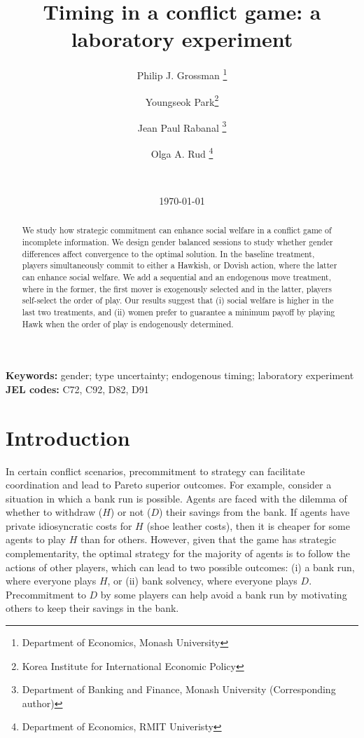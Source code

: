\documentclass[12pt, letterpaper]{article}
\theoremstyle{plain}
\begin{document}
\newtheorem{Assumption}{Assumption}
\newtheorem{Proposition}{Proposition}
\newtheorem{Corollary}{Corollary}
\newtheorem{Hypothesis}{Hypothesis}
\newtheorem{Result}{Result}


\title{Timing in a conflict game: a laboratory experiment}

\author{Philip J. Grossman
\footnote{Department of Economics, Monash University} \and Youngseok Park\thanks{Korea Institute for International Economic Policy} \and Jean Paul Rabanal
\thanks{Department of Banking and Finance, Monash University (Corresponding author)}
 \and Olga A. Rud \footnote{Department of Economics, RMIT Univeristy} \and  \ }
\date{\today}
\maketitle


\begin{abstract}
We study how strategic commitment can enhance social welfare in a conflict game of incomplete information. We design gender balanced sessions to study whether gender differences affect convergence to the optimal solution. In the baseline treatment, players simultaneously commit to either a Hawkish, or Dovish action, where the latter can enhance social welfare. We add a sequential and an endogenous move treatment, where in the former, the first mover is exogenously selected and in the latter, players self-select the order of play. Our results suggest that (i) social welfare is higher in the last two treatments, and (ii) women prefer to guarantee a minimum payoff by playing Hawk when the order of play is endogenously determined.

\end{abstract}
\textbf{Keywords:}
gender; type uncertainty; endogenous timing; laboratory experiment\\
\textbf{JEL codes:} C72, C92, D82, D91
\newpage
\section{Introduction}
\label{sec:intro}
In certain conflict scenarios, precommitment to strategy can facilitate coordination and lead to Pareto superior outcomes. For example, consider a situation in which a bank run is possible. Agents are faced with the dilemma of whether to withdraw ($H$) or not ($D$) their savings from the bank. If agents have private idiosyncratic costs for $H$ (shoe leather costs), then it is cheaper for some agents to play $H$ than for others. However,  given that the game has strategic complementarity, the optimal strategy for the majority of agents is to follow the actions of other players, which can lead to two possible outcomes: (i) a bank run, where everyone plays $H$, or (ii) bank solvency, where everyone plays $D$. Precommitment to $D$ by some players can help avoid a bank run by motivating others to keep their savings in the bank. 
\end{document}
